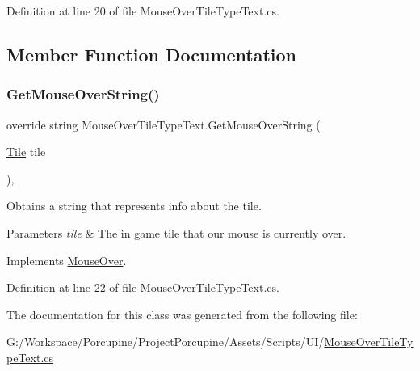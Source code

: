 Definition at line 20 of file Mouse\+Over\+Tile\+Type\+Text.\+cs.



\subsection{Member Function Documentation}
\mbox{\label{class_mouse_over_tile_type_text_a37c845af19b0857a71a8827058186d9f}} 
\subsubsection{\texorpdfstring{Get\+Mouse\+Over\+String()}{GetMouseOverString()}}
{\footnotesize\ttfamily override string Mouse\+Over\+Tile\+Type\+Text.\+Get\+Mouse\+Over\+String (\begin{DoxyParamCaption}\item[{\hyperlink{class_tile}{Tile}}]{tile }\end{DoxyParamCaption})\hspace{0.3cm}{\ttfamily [protected]}, {\ttfamily [virtual]}}



Obtains a string that represents info about the tile. 


\begin{DoxyParams}{Parameters}
{\em tile} & The in game tile that our mouse is currently over.\\
\hline
\end{DoxyParams}


Implements \hyperlink{class_mouse_over_a9878f4e4b19afa1056f4386aa0e67452}{Mouse\+Over}.



Definition at line 22 of file Mouse\+Over\+Tile\+Type\+Text.\+cs.



The documentation for this class was generated from the following file\+:\begin{DoxyCompactItemize}
\item 
G\+:/\+Workspace/\+Porcupine/\+Project\+Porcupine/\+Assets/\+Scripts/\+U\+I/\hyperlink{_mouse_over_tile_type_text_8cs}{Mouse\+Over\+Tile\+Type\+Text.\+cs}\end{DoxyCompactItemize}
